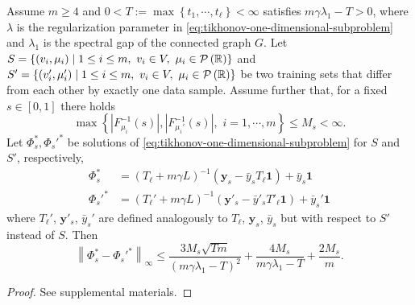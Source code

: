 \documentclass[letterpaper]{article} %
\begin{document}
\begin{theorem}
  \label{thm:slice-algorithmic-stability}
  Assume $m\geq 4$ and $0<T:=\max \left\{ t_1,\cdots,t_{\ell} \right\}<\infty$ satisfies $m\gamma\lambda_1-T>0$, where $\lambda$ is the regularization parameter in \eqref{eq:tikhonov-one-dimensional-subproblem} and $\lambda_1$ is the spectral gap of the connected graph $G$. Let $S=\left\{ \left( v_i,\mu_i \right)\mid 1\leq i\leq m,\,\,v_i\in V,\,\,\mu_i\in\P\left( \mathbb{R} \right) \right\}$ and $S'=\left\{ \left( v'_i,\mu'_i \right)\mid 1\leq i\leq m,\,\,v_i\in V,\,\,\mu_i\in\P\left( \mathbb{R} \right) \right\}$ be two training sets that differ from each other by exactly one data sample. Assume further that, for a fixed $s\in \left[ 0,1 \right]$ there holds
  \begin{equation}
    \label{eq:quantile-boundedness}
    \max \left\{ \left|F_{\mu_i}^{-1} \left( s \right)\right|, \left|F_{\mu_i'}^{-1} \left( s \right)\right|,\,\,i=1,\cdots,m\right\}\leq M_s<\infty.
  \end{equation}
  Let $\Phi_s^{*},\Phi_s'^{*}$ be solutions of \eqref{eq:tikhonov-one-dimensional-subproblem} for $S$ and $S'$, respectively,
  \begin{equation*}
    \begin{aligned}
      \Phi_s^{*}&=\left( T_{\ell}+m\gamma L \right)^{-1}\left(\mathbf{y}_s-\bar{y}_sT_\ell\mathbf{1}\right)+\bar{y}_s\mathbf{1}\\
      \Phi_s'^{*}&=\left( T_{\ell}'+m\gamma L \right)^{-1}\left(\mathbf{y}'_s-\bar{y}'_sT'_\ell\mathbf{1}\right)+\bar{y}_s'\mathbf{1}
    \end{aligned}
  \end{equation*}
  where $T_{\ell}'$, $\mathbf{y}'_s$, $\bar{y}_s'$ are defined analogously to $T_{\ell}$, $\mathbf{y}_s$, $\bar{y}_s$ but with respect to $S'$ instead of $S$. Then
  \begin{equation}
    \label{eq:slice-algorithmic-stability}
    \left\| \Phi_s^{*} -\Phi_s'^{*} \right\|_{\infty} \leq \frac{3M_s\sqrt{Tm}}{\left( m\gamma\lambda_1-T \right)^2}+\frac{4M_s}{m\gamma\lambda_1-T}+\frac{2M_s}{m}.
  \end{equation}
\end{theorem}
\begin{proof}
  See supplemental materials.
\end{proof}
\end{document}
